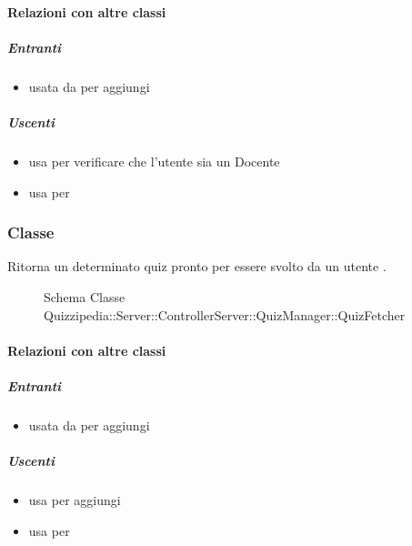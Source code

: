 \paragraph{Relazioni con altre classi}
\subparagraph{Entranti}
\begin{itemize}
\item usata da  per aggiungi
\end{itemize}
\subparagraph{Uscenti}
\begin{itemize}
\item usa  per verificare che l'utente sia un Docente
\item usa  per 
\end{itemize}
\subsubsection{Classe }
Ritorna un determinato quiz pronto per essere svolto da un utente .
\begin{figure}[H]
\centering
\noindent{}
\caption[Schema Classe QuizFetcher]{Schema Classe Quizzipedia::Server::ControllerServer::QuizManager::QuizFetcher}
\end{figure}
\paragraph{Relazioni con altre classi}
\subparagraph{Entranti}
\begin{itemize}
\item usata da  per aggiungi
\end{itemize}
\subparagraph{Uscenti}
\begin{itemize}
\item usa  per aggiungi
\item usa  per 
\end{itemize}
